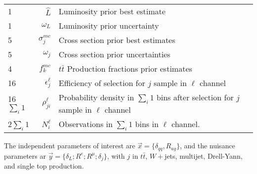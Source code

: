 \documentclass{article}
\begin{document}
\begin{center}
  \begin{tabular}{lrl}
    1&$\hat{L}$ & Luminosity prior best estimate \\
    1&$\omega_L$ & Luminosity prior uncertainty\\
    5&$\sigma_j^{mc}$ & Cross section prior best estimates\\
    5&$\omega_j$ & Cross section prior uncertainties\\
    4&$f^{mc}_k$ & $t\bar{t}$ Production fractions prior estimates\\
    16&$\epsilon_j^\ell$ & Efficiency of selection for $j$ sample in $\ell$ channel\\
    16$\sum_i1$&$\rho_{ji}^\ell$ & Probability density in $\sum_i1$ bins after selection for $j$ sample in $\ell$ channel\\
    2$\sum_i1$&$N_i^\ell$ & Observations in $\sum_i1$ bins in $\ell$ channel.
  \end{tabular}
\end{center}
The independent parameters of interest are $\vec{x} =
\{\delta_{qq},R_{ag}\}$, and the nuisance parameters ar $\vec{y}
= \{\delta_L;R^e;R^\mu;\delta_j\}$, with $j$ in $t\bar{t}$, $W+$jets, multijet,
Drell-Yann, and single top production.
\end{document}
